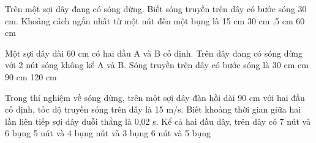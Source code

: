 \begin{vidu}%
 Trên một sợi dây đang có sóng dừng. Biết sóng truyền trên dây có bước sóng 30 cm. Khoảng cách ngắn nhất từ một nút đến một bụng là
\choice
{15 cm}
{30 cm}
{,5 cm}
{60 cm}
\end{vidu} 
\begin{vidu}%
 Một sợi dây dài 60 cm có hai đầu A và B cố định. Trên dây đang có sóng dừng với 2 nút sóng không kể A và B. Sóng truyền trên dây có bước sóng là
\choice
{30 cm}
{ cm}
{90 cm}
{120 cm}
\end{vidu} 
\begin{vidu}%
Trong thí nghiệm về sóng dừng, trên một sợi dây đàn hồi dài 90 cm với hai đầu cố định, tốc độ truyền sóng trên dây là 15 m/s. Biết khoảng thời gian giữa hai lần liên tiếp sợi dây duỗi thẳng là 0,02 s. Kể cả hai đầu dây, trên dây có
\choice
{7 nút và 6 bụng}
{5 nút và 4 bụng}
{ nút và 3 bụng}
{6 nút và 5 bụng}
\end{vidu} 

